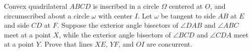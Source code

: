 Convex quadrilateral $ABCD$ is inscribed in a circle $\Omega$ centered at $O$, and circumscribed about a circle $\omega$ with center $I$. Let $\omega$ be tangent to side $AB$ at $E$ and side $CD$ at $F$. Suppose the exterior angle bisectors of $\angle{DAB}$ and $\angle{ABC}$ meet at a point $X$, while the exterior angle bisectors of $\angle{BCD}$ and $\angle{CDA}$ meet at a point $Y$. Prove that lines $XE$, $YF$, and $OI$ are concurrent.
